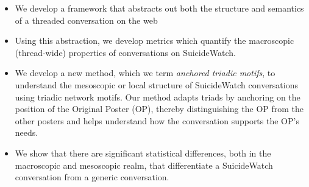 \begin{itemize}[noitemsep]
    \item We develop a framework  that abstracts out both the structure and semantics of a threaded conversation on the web
    \item Using this abstraction, we develop metrics which quantify the macroscopic (thread-wide) properties of conversations on SuicideWatch. 
    \item We develop a new method, which we term \textit{anchored triadic motifs}, to understand the mesoscopic or local structure of SuicideWatch conversations using triadic network motifs. Our method adapts triads by anchoring on the position of the Original Poster (OP), thereby distinguishing the OP from the other posters and helps understand how the conversation supports the OP's needs. 
    \item We show that there are significant statistical differences, both in the macroscopic and mesoscopic realm, that differentiate a SuicideWatch conversation from a generic conversation. 
\end{itemize}


